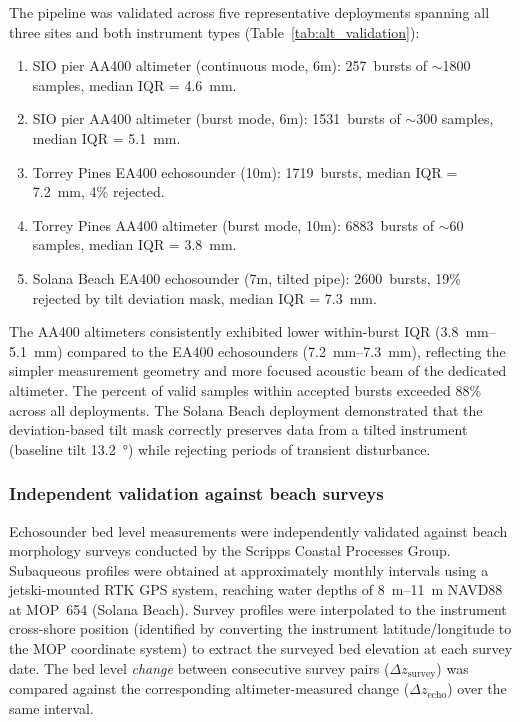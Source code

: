 The pipeline was validated across five representative deployments
spanning all three sites and both instrument types
(Table~\ref{tab:alt_validation}):

\begin{enumerate}
  \item SIO pier AA400 altimeter (continuous mode, 6m): 257~bursts of
    $\sim$1800 samples, median IQR = \SI{4.6}{\milli\meter}.
  \item SIO pier AA400 altimeter (burst mode, 6m): 1531~bursts of
    $\sim$300 samples, median IQR = \SI{5.1}{\milli\meter}.
  \item Torrey Pines EA400 echosounder (10m): 1719~bursts, median
    IQR = \SI{7.2}{\milli\meter}, 4\% rejected.
  \item Torrey Pines AA400 altimeter (burst mode, 10m): 6883~bursts
    of $\sim$60 samples, median IQR = \SI{3.8}{\milli\meter}.
  \item Solana Beach EA400 echosounder (7m, tilted pipe): 2600~bursts,
    19\% rejected by tilt deviation mask, median
    IQR = \SI{7.3}{\milli\meter}.
\end{enumerate}

The AA400 altimeters consistently exhibited lower within-burst IQR
(\SIrange{3.8}{5.1}{\milli\meter}) compared to the EA400 echosounders
(\SIrange{7.2}{7.3}{\milli\meter}), reflecting the simpler measurement
geometry and more focused acoustic beam of the dedicated altimeter.
The percent of valid samples within accepted bursts exceeded 88\%
across all deployments. The Solana Beach deployment demonstrated
that the deviation-based tilt mask correctly preserves data from a
tilted instrument (baseline tilt \SI{13.2}{\degree}) while rejecting
periods of transient disturbance.

\subsubsection{Independent validation against beach surveys}

Echosounder bed level measurements were independently validated
against beach morphology surveys conducted by the Scripps Coastal
Processes Group. Subaqueous profiles were obtained at approximately
monthly intervals using a jetski-mounted RTK GPS system, reaching
water depths of \SIrange{8}{11}{\meter} NAVD88 at MOP~654 (Solana
Beach). Survey profiles were interpolated to the instrument cross-shore
position (identified by converting the instrument latitude/longitude
to the MOP coordinate system) to extract the surveyed bed elevation
at each survey date. The bed level \emph{change} between consecutive
survey pairs ($\Delta z_\text{survey}$) was compared against the
corresponding altimeter-measured change ($\Delta z_\text{echo}$)
over the same interval.

